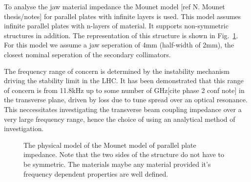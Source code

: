 To analyse the jaw material impedance the Mounet model [ref N. Mounet thesis/notes] for parallel plates with infinite layers is used. This model assumes infinite parallel plates with n-layers of material. It supports non-symmetric structures in addition. The representation of this structure is shown in Fig.~\ref{fig:mounet-model}. For this model we assume a jaw seperation of 4mm (half-width of 2mm), the closest nominal seperation of the secondary collimators.

The frequency range of concern is determined by the instability mechanism driving the stability limit in the LHC. It has been demonstrated that this range of concern is from 11.8kHz up to some number of GHz[cite phase 2 conf note] in the transverse plane, driven by loss due to tune spread over an optical resonance. This neccessitates investigating the transverse beam coupling impedance over a very large frequency range, hence the choice of using an analytical method of investigation.

\begin{figure}
\label{fig:mounet-model}
\caption{The physical model of the Mounet model of parallel plate impedance. Note that the two sides of the structure do not have to be symmetric. The materials maybe any material provided it's frequency dependent properties are well defined.}
\end{figure}

